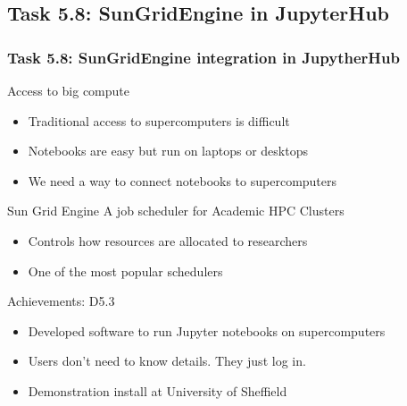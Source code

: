 \documentclass{beamer}
\begin{document}
\subsection{Task 5.8: SunGridEngine in JupyterHub}
\begin{frame}
  \frametitle{Task 5.8: SunGridEngine integration in JupytherHub}
  \begin{block}{Access to big compute}
   \begin{itemize}
   \item Traditional access to supercomputers is difficult
   \item Notebooks are easy but run on laptops or desktops
   \item We need a way to connect notebooks to supercomputers
   \end{itemize}
  \end{block}
  \begin{block}{Sun Grid Engine}
    A job scheduler for Academic HPC Clusters
    \begin{itemize}
    \item Controls how resources are allocated to researchers
    \item One of the most popular schedulers
    \end{itemize}
  \end{block}

  \begin{block}{Achievements: D5.3}
  \begin{itemize}
  \item Developed software to run Jupyter notebooks on supercomputers
  \item Users don't need to know details. They just log in.
  \item Demonstration install at University of Sheffield
  \end{itemize}
  \end{block}
\end{frame}

\end{document}
